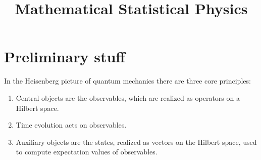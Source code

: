 \documentclass[
a4paper, %
11pt, %
onecolumn, %
openany, %
]{memoir}
\author{}
\title{Mathematical Statistical Physics}
\theoremstyle{definition}
\theoremstyle{remark}
\theoremstyle{plain}
\begin{document}
\setlength{\parindent}{0pt}
\maketitle
\tableofcontents

\newpage\chapter{Preliminary stuff}
In the Heisenberg picture of quantum mechanics there are three core principles: \begin{enumerate}
	\item Central objects are the observables, which are realized as operators on a Hilbert space.
	\item Time evolution acts on observables.
	\item Auxiliary objects are the states, realized as vectors on the Hilbert space, used to compute expectation values of observables.
\end{enumerate}
\end{document}
